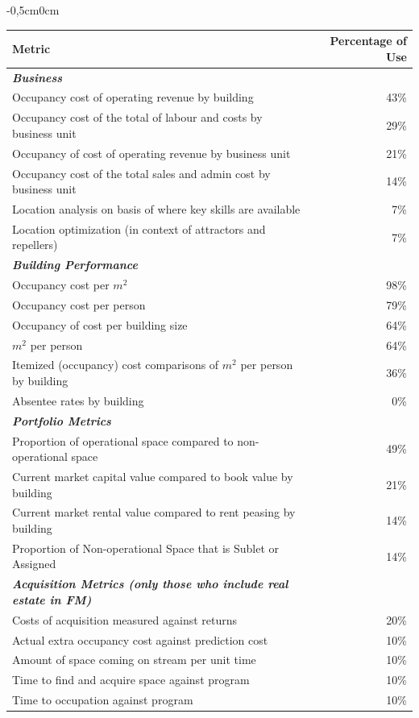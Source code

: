 \begin{table}[h!]
	\vspace{0cm}
	\begin{adjustwidth}{-0,5cm}{0cm}
	\begin{tabular}{l r}
		\hline
		\multicolumn{1}{l}{\bf Metric} & \multicolumn{1}{r}{ \bf Percentage of Use } \\ 
		\hline

		{\bf {\emph{Business}}} & \\
		Occupancy cost of operating revenue by building &  43\% \\
		Occupancy cost of the total of labour and costs by business unit &  29\% \\
		Occupancy of cost of operating revenue by business unit &  21\% \\ 
		Occupancy cost of the total sales and admin cost by business unit  &  14\% \\ 
		Location analysis on basis of where key skills are available & 7\% \\ 
		Location optimization (in context of attractors and repellers) &  7\% \\ 
		\hline

		{\bf {\emph{Building Performance}}} & \\
		Occupancy cost per $m^2$ &  98\% \\
		Occupancy cost per person &  79\% \\
		Occupancy of cost per building size &  64\% \\ 
		$m^2$ per person  &  64\% \\ 
		Itemized (occupancy) cost comparisons of $m^2$ per person by building & 36\% \\ 
		Absentee rates by building &  0\% \\ 
		\hline

		{\bf {\emph{Portfolio Metrics}}} & \\
		Proportion of operational space compared to non-operational space &  49\% \\
		Current market capital value compared to book value by building &  21\% \\
		Current market rental value compared to rent peasing by building &  14\% \\ 
		Proportion of Non-operational Space that is Sublet or Assigned  &  14\% \\ 
		\hline

		{\bf {\emph{Acquisition Metrics (only those who include real estate in FM)}}} & \\
		Costs of acquisition measured against returns &  20\% \\
		Actual extra occupancy cost against prediction cost &  10\% \\
		Amount of space coming on stream per unit time &  10\% \\ 
		Time to find and acquire space against program &  10\% \\ 
		Time to occupation against program & 10\% \\ 
		\hline


\end{tabular}
\end{adjustwidth}
\end{table}
